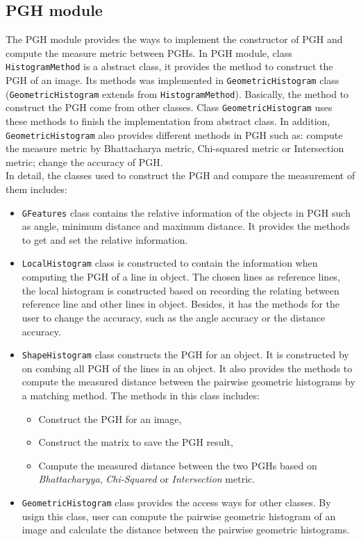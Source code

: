 \subsection{PGH module}
The PGH module provides the ways to implement the constructor of PGH and compute the measure metric between PGHs. In PGH module, class \texttt{HistogramMethod} is a abstract class, it provides the method to construct the PGH of an image. Its methods was implemented in \texttt{GeometricHistogram} class (\texttt{GeometricHistogram} extends from \texttt{HistogramMethod}). Basically, the method to construct the PGH come from other classes. Class \texttt{GeometricHistogram} uses these methods to finish the implementation from abstract class. In addition, \texttt{GeometricHistogram} also provides different methods in PGH such as: compute the measure metric by Bhattacharya metric, Chi-squared metric or Intersection metric; change the accuracy of PGH.\\
In detail, the classes used to construct the PGH and compare the measurement of them includes:
\begin{itemize}
\item \texttt{GFeatures} class contains the relative information of the objects in PGH such as angle, minimum distance and maximum distance. It provides the methods to get and set the relative information.
\item \texttt{LocalHistogram} class is constructed to contain the information when computing the PGH of a line in object. The chosen lines as reference lines, the local histogram is constructed based on recording the relating between reference line and other lines in object. Besides, it has the methods for the user to change the accuracy, such as the angle accuracy or the distance accuracy.
\item \texttt{ShapeHistogram} class constructs the PGH for an object. It is constructed by on combing all PGH of the lines in an object. It also provides the methods to compute the measured distance between the pairwise geometric histograms by a matching method. The methods in this class includes:
\begin{itemize}
\item Construct the PGH for an image,
\item Construct the matrix to save the PGH result,
\item Compute the measured distance between the two PGHs based on \textit{Bhattacharyya}, \textit{Chi-Squared} or \textit{Intersection} metric.
\end{itemize}
\item \texttt{GeometricHistogram} class provides the access ways for other classes. By usign this class, user can compute the pairwise geometric histogram of an image and calculate the distance between the pairwise geometric histograms.
\end{itemize}
